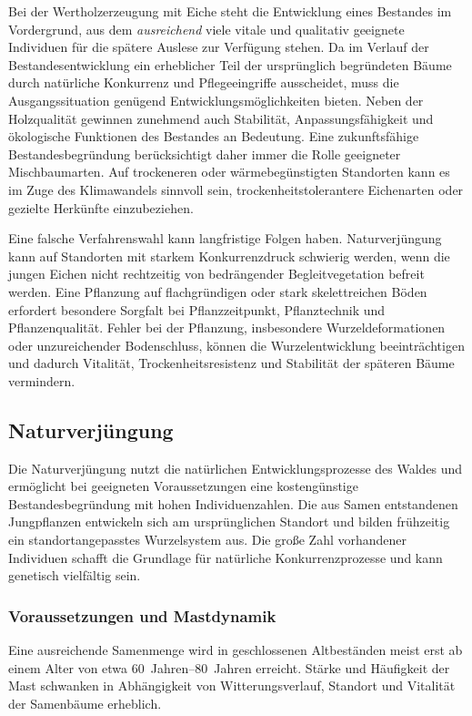 \documentclass[twocolumn, bibliography=totoc, abstract=true]{scrartcl}
\begin{document}
Bei der Wertholzerzeugung mit Eiche steht die Entwicklung eines Bestandes im Vordergrund, aus dem \emph{ausreichend} viele vitale und qualitativ geeignete Individuen für die spätere Auslese zur Verfügung stehen. Da im Verlauf der Bestandesentwicklung ein erheblicher Teil der ursprünglich begründeten Bäume durch natürliche Konkurrenz und Pflegeeingriffe ausscheidet, muss die Ausgangssituation genügend Entwicklungsmöglichkeiten bieten. Neben der Holzqualität gewinnen zunehmend auch Stabilität, Anpassungsfähigkeit und ökologische Funktionen des Bestandes an Bedeutung. Eine zukunftsfähige Bestandesbegründung berücksichtigt daher immer die Rolle geeigneter Mischbaumarten. Auf trockeneren oder wärmebegünstigten Standorten kann es im Zuge des Klimawandels sinnvoll sein, trockenheitstolerantere Eichenarten oder gezielte Herkünfte einzubeziehen.

Eine falsche Verfahrenswahl kann langfristige Folgen haben. Naturverjüngung kann auf Standorten mit starkem Konkurrenzdruck schwierig werden, wenn die jungen Eichen nicht rechtzeitig von bedrängender Begleitvegetation befreit werden. Eine Pflanzung auf flachgründigen oder stark skelettreichen Böden erfordert besondere Sorgfalt bei Pflanzzeitpunkt, Pflanztechnik und Pflanzenqualität. Fehler bei der Pflanzung, insbesondere Wurzeldeformationen oder unzureichender Bodenschluss, können die Wurzelentwicklung beeinträchtigen und dadurch Vitalität, Trockenheitsresistenz und Stabilität der späteren Bäume vermindern.


\subsection{Naturverjüngung}

Die Naturverjüngung nutzt die natürlichen Entwicklungsprozesse des Waldes und ermöglicht bei geeigneten Voraussetzungen eine kostengünstige Bestandesbegründung mit hohen Individuenzahlen. Die aus Samen entstandenen Jungpflanzen entwickeln sich am ursprünglichen Standort und bilden frühzeitig ein standortangepasstes Wurzelsystem aus. Die große Zahl vorhandener Individuen schafft die Grundlage für natürliche Konkurrenzprozesse und kann genetisch vielfältig sein.

\subsubsection{Voraussetzungen und Mastdynamik}

Eine ausreichende Samenmenge wird in geschlossenen Altbeständen meist erst ab einem Alter von etwa \qtyrange{60}{80}{Jahren} erreicht. Stärke und Häufigkeit der Mast schwanken in Abhängigkeit von Witterungsverlauf, Standort und Vitalität der Samenbäume erheblich.
\end{document}
